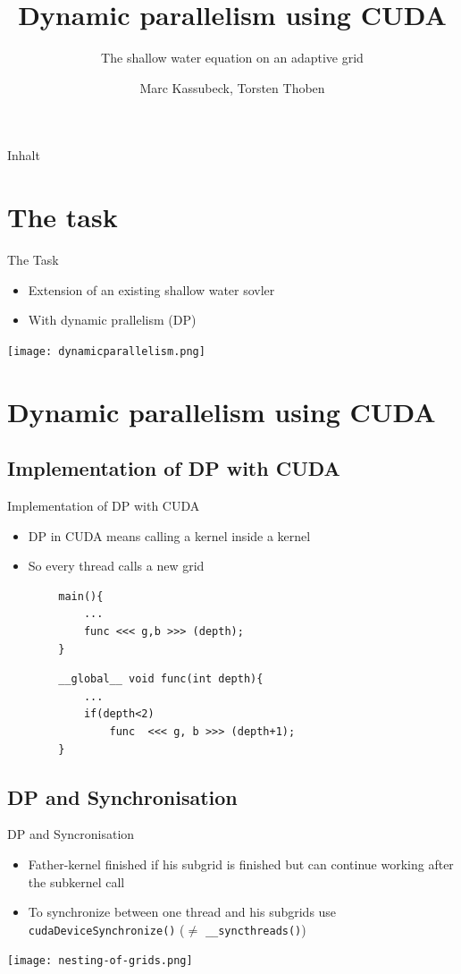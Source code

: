 \documentclass[fleqn,11pt,aspectratio=43]{beamer}
\title{Dynamic parallelism using CUDA}
\subtitle{The shallow water equation on an adaptive grid}
\author{Marc Kassubeck, Torsten Thoben}
\begin{document}
\begin{frame}[plain]
\titlepage
\end{frame}

\begin{frame}{Inhalt}
\tableofcontents
\end{frame}


\section{The task}
\begin{frame}{The Task}
	\begin{itemize}
		\item Extension of an existing shallow water sovler
		\item With dynamic prallelism (DP)
	\end{itemize}
	\centering
	\texttt{[image: dynamicparallelism.png]}
\end{frame}

\section{Dynamic parallelism using CUDA}

\subsection{Implementation of DP with CUDA}	
\begin{frame}[fragile]{Implementation of DP with CUDA}
	\begin{itemize}
		\item DP in CUDA means calling a kernel inside a kernel
		\item So every thread calls a new grid
	\end{itemize}

	\begin{verbatim}
		main(){
		    ...
		    func <<< g,b >>> (depth);
		}
	\end{verbatim}	

	\begin{verbatim}
		__global__ void func(int depth){
		    ...
		    if(depth<2)
		        func  <<< g, b >>> (depth+1);
		}
	\end{verbatim}
\end{frame}

\subsection{DP and Synchronisation}
\begin{frame}{DP and Syncronisation}
	\begin{itemize}
		\item Father-kernel finished if his subgrid is finished but can continue working after the subkernel call
		\item To synchronize between one thread and his subgrids use \texttt{cudaDeviceSynchronize()} ($\neq$ \texttt{\_\_syncthreads()})
	\end{itemize}
	\centering
	\texttt{[image: nesting-of-grids.png]}
\end{frame}
\end{document}
